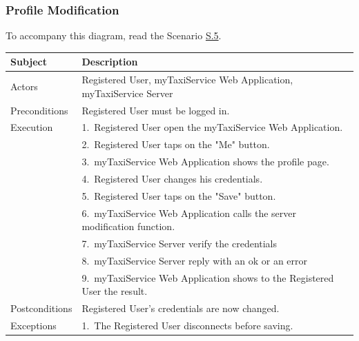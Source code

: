 \subsubsection{Profile Modification}
			To accompany this diagram, read the Scenario \hyperref[sec:RegisteredUserProfileModificationScenario]{S.5}.

				\begin{table}[htpb]
					\centering
					\label{tab:RegisteredUserProfileModificationDiagramTable}
					\begin{tabularx}{\textwidth}{lp{9cm}}
						\hline
						\hline
							\textbf{Subject}
						& 
							\textbf{Description}\\
						\hline
							Actors	       &  Registered User, myTaxiService Web Application, myTaxiService Server\\
						\hline
							Preconditions  &  Registered User must be logged in.\\
						\hline
							Execution      &  1.~Registered User open the myTaxiService Web Application.\\
										   &  2.~Registered User taps on the "Me" button.\\
										   &  3.~myTaxiService Web Application shows the profile page.\\
										   &  4.~Registered User changes his credentials.\\
										   &  5.~Registered User taps on the "Save" button.\\
										   &  6.~myTaxiService Web Application calls the server modification function.\\
										   &  7.~myTaxiService Server verify the credentials\\
										   &  8.~myTaxiService Server reply with an ok or an error\\
										   &  9.~myTaxiService Web Application shows to the Registered User the result.\\
						\hline
							Postconditions &  Registered User's credentials are now changed.\\
						\hline
							Exceptions     &  1.~The Registered User disconnects before saving.\\
									
						\hline
						\hline
					\end{tabularx}
				\end{table}
				
